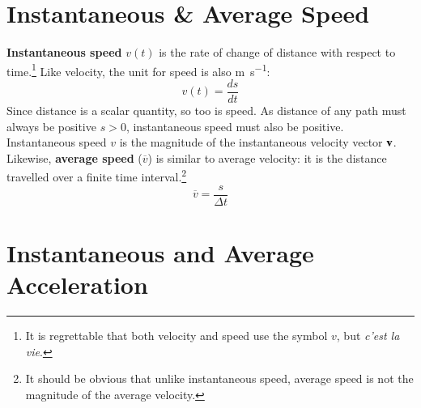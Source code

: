 \documentclass{../../../oss-handout}
\newcommand{\mb}[1]{\ensuremath\mathbf{#1}}
\begin{document}
\section{Instantaneous \& Average Speed}

\textbf{Instantaneous speed} $v(t)$ is the rate of change of distance with
respect to time.\footnote{It is regrettable that both velocity and speed use
  the symbol $v$, but \emph{c'est la vie}.} Like velocity, the unit for
speed is also \si{\metre\per\second}:
\begin{equation*}
  \boxed{v(t)=\frac{ds}{dt}}
\end{equation*}
Since distance is a scalar quantity, so too is speed. As distance of any path
must always be positive $s>0$, instantaneous speed must also be positive.
Instantaneous speed $v$ is the magnitude of the instantaneous velocity vector
$\mb{v}$. Likewise, \textbf{average speed} ($\overline{v}$) is similar to
average velocity: it is the distance travelled over a finite time
interval.\footnote{It should be obvious that unlike instantaneous speed, average
  speed is not the magnitude of the average velocity.}
\begin{equation}
  \boxed{\overline{v}=\frac{s}{\Delta t}}
\end{equation}



%


\section{Instantaneous and Average Acceleration}
\end{document}
